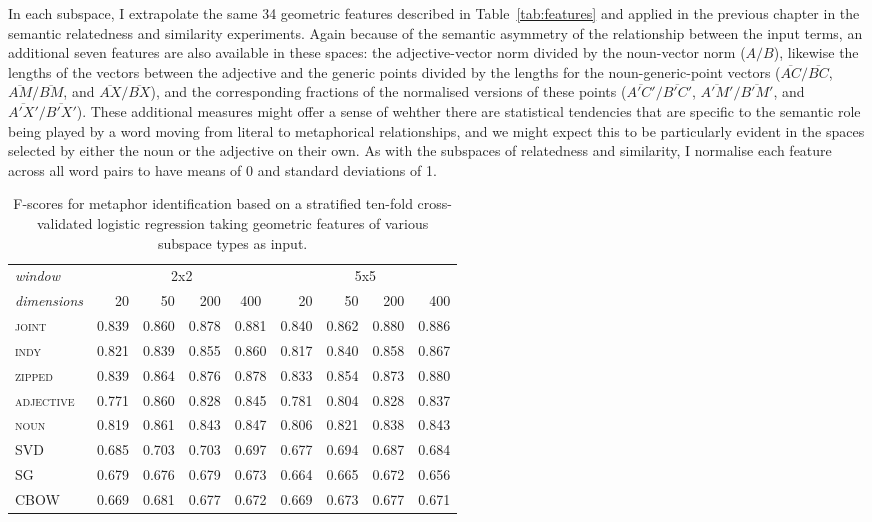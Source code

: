 In each subspace, I extrapolate the same 34 geometric features described in Table~\ref{tab:features} and applied in the previous chapter in the semantic relatedness and similarity experiments.  Again because of the semantic asymmetry of the relationship between the input terms, an additional seven features are also available in these spaces: the adjective-vector norm divided by the noun-vector norm ($A/B$), likewise the lengths of the vectors between the adjective and the generic points divided by the lengths for the noun-generic-point vectors ($\overline{AC}/\overline{BC}$, $\overline{AM}/\overline{BM}$, and $\overline{AX}/\overline{BX}$), and the corresponding fractions of the normalised versions of these points ($\overline{A'C'}/\overline{B'C'}$, $\overline{A'M'}/\overline{B'M'}$, and $\overline{A'X'}/\overline{B'X'}$).  These additional measures might offer a sense of wehther there are statistical tendencies that are specific to the semantic role being played by a word moving from literal to metaphorical relationships, and we might expect this to be particularly evident in the spaces selected by either the noun or the adjective on their own.  As with the subspaces of relatedness and similarity, I normalise each feature across all word pairs to have means of 0 and standard deviations of 1.

\begin{table}
\centering
\begin{tabular}{lrrrr|rrrr}
\hline
\emph{window} & \multicolumn{4}{c}{2x2} & \multicolumn{4}{c}{5x5} \\
\emph{dimensions} & 20 & 50 & 200 & \multicolumn{1}{c}{400} & 20 & 50 & 200 & 400 \\
\hline
\textsc{joint} & 0.839 & 0.860 & 0.878 & 0.881 & 0.840 & 0.862 & 0.880 & 0.886 \\
\textsc{indy} & 0.821 & 0.839 & 0.855 & 0.860 & 0.817 & 0.840 & 0.858 & 0.867 \\
\textsc{zipped} & 0.839 & 0.864 & 0.876 & 0.878 & 0.833 & 0.854 & 0.873 & 0.880 \\
\textsc{adjective} & 0.771 & 0.860 & 0.828 & 0.845 & 0.781 & 0.804 & 0.828 & 0.837 \\
\textsc{noun} & 0.819 & 0.861 & 0.843 & 0.847 & 0.806 & 0.821 & 0.838 & 0.843 \\
\textsc{SVD} & 0.685 & 0.703 & 0.703 & 0.697 & 0.677 & 0.694 & 0.687 & 0.684 \\
\textsc{SG} & 0.679 & 0.676 & 0.679 & 0.673 & 0.664 & 0.665 & 0.672 & 0.656 \\
\textsc{CBOW} & 0.669 & 0.681 & 0.677 & 0.672 & 0.669 & 0.673 & 0.677 & 0.671 \\
\hline
\end{tabular}
\caption[Context Sensitive and Static Model F-Scores for Metaphor Classification]{F-scores for metaphor identification based on a stratified ten-fold cross-validated logistic regression taking geometric features of various subspace types as input.}
\label{tab:metaphor}
\end{table}

